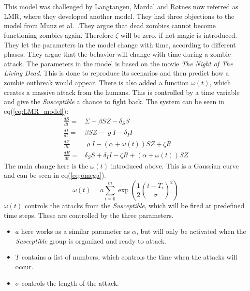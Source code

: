 \documentclass[%
twoside,                 %
final,                   %
10pt]{article}
\begin{document}
\noindent
\\
\\
This model was challenged by Langtangen, Mardal and Røtnes \cite{zombie-math} now referred as LMR, where they developed another model. They had three objections to the model from Munz et al.~\cite{munz2009zombies}.They argue that dead zombies cannot become functioning zombies again. Therefore $\zeta$ will be zero, if not magic is introduced. They let the parameters in the model change with time, according to different phases. They argue that the behavior will change with time during a zombie attack. The parameters in the model is based on the movie \emph{The Night of The Living Dead}. This is done to reproduce its scenarios and then predict how a zombie outbreak would appear. There is also added a function $\omega(t)$, which creates a massive attack from the humans. This is controlled by a time variable and give the \emph{Susceptible} a chance to fight back. The system can be seen in eq(\ref{eq:LMR_model}):
\begin{equation} \label{eq:LMR_model}
	\begin{aligned} 
	\frac{dS}{dt} =& \Sigma -\beta SZ - \delta_SS \\
	\frac{dI}{dt} =& \beta SZ - \varrho I - \delta_II\\
	\frac{dZ}{dt} =& \varrho I- (\alpha+\omega(t))SZ + \zeta R\\
	\frac{dR}{dt} =& \delta_SS +\delta_II -\zeta R + (\alpha+\omega(t))SZ 
	\end{aligned}
\end{equation}
The main change here is the $\omega(t)$ introduced above. This is a Gaussian curve and can be seen in eq(\ref{eq:omega}).
\begin{equation} \label{eq:omega}
\omega(t) = a \sum^m_{i=0}\exp\left(\frac{1}{2}\left(\frac{t-T_i}{\sigma}\right)^2\right)
\end{equation}
$\omega(t)$ controls the attacks from the \emph{Susceptible}, which will be fired at predefined time steps. These are controlled by the three parameters. 
\begin{itemize}
\item $a$ here works as a similar parameter as $\alpha$, but will only be activated when the \emph{Susceptible} group is organized and ready to attack. 

\item $T$ contains a list of numbers, which controls the time when the attacks will occur.

\item $\sigma$ controls the length of the attack. 
\end{itemize}
\end{document}
